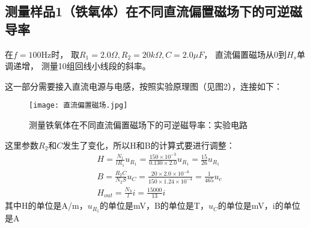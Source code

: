 \documentclass[11pt]{article}
\begin{document}
\subsection{测量样品1（铁氧体）在不同直流偏置磁场下的可逆磁导率}

在$f=100\text{Hz}$时，
取$R_1=2.0\Omega,R_2=20k\Omega,C=2.0\mu F$，
直流偏置磁场从$0$到$H_s$单调递增，
测量10组回线小线段的斜率。

这一部分需要接入直流电源与电感，按照实验原理图（见图2），连接如下：
\begin{figure}[H]
    \centering
    \texttt{[image: 直流偏置磁场.jpg]}
    \caption{测量铁氧体在不同直流偏置磁场下的可逆磁导率：实验电路}
\end{figure}


这里参数$R_2$和$C$发生了变化，所以H和B的计算式要进行调整：
\begin{align*}
    &H=\frac{N_1}{l R_1}u_{R_1}=\frac{150\times 10^{-3}}{0.130\times 2.0}u_{R_1}=\frac{15}{26}u_{R_1}\\
    &B = \frac{R_2 C}{N_2 S}u_C=\frac{20\times 2.0\times 10^{-6}}{150\times 1.24\times 10^{-4}}=\frac{1}{465}u_c\\
    &H_{out}=\frac{N_3}{l}i=\frac{15000}{13}i
\end{align*}
其中H的单位是A/m，$u_{R_1}$的单位是mV，B的单位是T，$u_C$的单位是mV，i的单位是A
\end{document}
